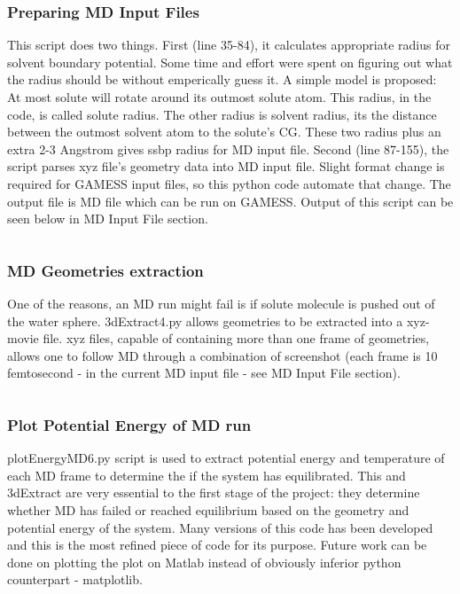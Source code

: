 \documentclass[
journal=jpcbfk, %
manuscript=article]{achemso}
\begin{document}
		\subsubsection{Preparing MD Input Files}
			This script does two things. First (line 35-84), it calculates appropriate radius for solvent boundary potential. Some time and effort were spent on figuring out what the radius should be without emperically guess it. A simple model is proposed: At most solute will rotate around its outmost solute atom. This radius, in the code, is called solute radius. The other radius is solvent radius, its the distance between the outmost solvent atom to the solute's CG. These two radius plus an extra 2-3 Angstrom gives ssbp radius for MD input file. Second (line 87-155), the script parses xyz file's geometry data into MD input file. Slight format change is required for GAMESS input files, so this python code automate that change. The output file is MD file which can be run on GAMESS. Output of this script can be seen below in MD Input File section.
			\vfill
			\inputminted[linenos, breaklines, baselinestretch=1, fontsize=\small]{python}{../pythonScripts/prepareMD2.py}
		
		\subsubsection{MD Geometries extraction}
			One of the reasons, an MD run might fail is if solute molecule is pushed out of the water sphere. 3dExtract4.py allows geometries to be extracted into a xyz-movie file. xyz files, capable of containing more than one frame of geometries, allows one to follow MD through a combination of screenshot (each frame is 10 femtosecond - in the current MD input file - see MD Input File section). 
			\inputminted[linenos, breaklines, baselinestretch=1, fontsize=\small]{python}{../pythonScripts/3dExtract4.py}
			
		\subsubsection{Plot Potential Energy of MD run}
			plotEnergyMD6.py script is used to extract potential energy and temperature of each MD frame to determine the if the system has equilibrated. This and 3dExtract are very essential to the first stage of the project: they determine whether MD has failed or reached equilibrium based on the geometry and potential energy of the system. Many versions of this code has been developed and this is the most refined piece of code for its purpose. Future work can be done on plotting the plot on Matlab instead of obviously inferior python counterpart - matplotlib. 
			\inputminted[linenos, breaklines, baselinestretch=1, fontsize=\small]{python}{../pythonScripts/plotEnergyMD6.py} 	
		
\end{document}
